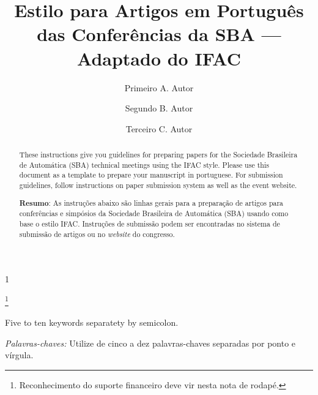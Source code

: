 \documentclass[a4paper]{ifacconf}
\def\portugues{1}
\def\portugues{0}
\begin{document}
	
	
\if\portugues1

% 
	
\begin{frontmatter}

\title{Estilo para Artigos em Português das Conferências da SBA --- Adaptado do  IFAC} 

\thanks[footnoteinfo]{Reconhecimento do suporte financeiro deve vir nesta nota de rodapé.}


\author[First]{Primeiro A. Autor} 
\author[Second]{Segundo B. Autor} 
\author[Third]{Terceiro C. Autor}

\address[First]{Faculdade de Engenharia Elétrica, Universidade do Triângulo, MG, (e-mail: autor1@faceg@univt.br).}
\address[Second]{Faculdade de Engenharia de Controle \& Automação, Universidade do Futuro, RJ (e-mail: autor2@feca.unifutu.rj)}
\address[Third]{Electrical Engineering Department, 
   Seoul National University, Seoul, Korea, (e-mail: author3@snu.ac.kr)}


\renewcommand{\abstractname}{{\bf Abstract:~}}
\begin{abstract}                %
These instructions give you guidelines for preparing papers for the Sociedade Brasileira de Automática (SBA) technical meetings using the IFAC style. Please use this document as a template to prepare your manuscript in portuguese. For submission guidelines, follow instructions on paper submission system as well as the event website.

\vskip 1mm%
{\noindent \bf Resumo}:  As instruções abaixo são linhas gerais para a preparação de artigos para conferências e simpósios da Sociedade Brasileira de Automática (SBA) usando como base o estilo IFAC. Instruções de submissão podem ser encontradas no sistema de submissão de artigos ou no {\em website} do congresso.
\end{abstract}



\begin{keyword}
Five to ten keywords separatety by semicolon. 

\vskip 1mm%
{\noindent\it Palavras-chaves:} Utilize de cinco a dez palavras-chaves separadas por ponto e vírgula.
\end{keyword}




\end{frontmatter}
\end{document}
